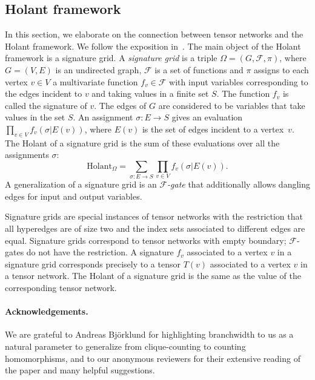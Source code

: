 \documentclass{toc}
\begin{document}
\subsection{Holant framework} \label{sec:Holant_theory}

In this section, we elaborate on the connection between tensor networks and the Holant framework. We follow the exposition in~\cite{CaiLX2011}. The main object of the Holant framework is a signature grid. A \emph{signature grid} is a triple $\Omega = (G,\mathcal{F},\pi)$, where $G=(V,E)$ is an undirected graph, $\mathcal{F}$ is a set of functions and $\pi$ assigns to each vertex $v \in V$ a multivariate function $f_v \in \mathcal{F}$ with input variables corresponding to the edges incident to $v$ and taking values in a finite set $S$. The function $f_v$ is called the signature of $v$. The edges of $G$ are considered to be variables that take values in the set $S$. An assignment $\sigma : E \rightarrow S$ gives an evaluation $\prod_{v \in V} f_v(\sigma|E(v))$, where $E(v)$ is the set of edges incident to a vertex~$v$. The Holant of a signature grid is the sum of these evaluations over all the assignments $\sigma$:
$$
\text{Holant}_{\Omega}=\sum_{\sigma:E \rightarrow S} \prod_{v \in V} f_v(\sigma|E(v)).
$$
A generalization of a signature grid is an \emph{$\mathcal{F}$-gate} that additionally allows dangling edges for input and output variables.

Signature grids are special instances of tensor networks with the restriction that all hyperedges are of size two and the index sets associated to different edges are equal. Signature grids correspond to tensor networks with empty boundary; $\mathcal{F}$-gates do not have the restriction. A signature $f_v$ associated to a vertex $v$ in a signature grid corresponds precisely to a tensor $T(v)$ associated to a vertex $v$ in a tensor network.  The Holant of a signature grid is the same as the value of the corresponding tensor network.


\paragraph{Acknowledgements.}  We are grateful to Andreas Bj\"orklund for highlighting branchwidth
to us as a natural parameter to generalize from clique-counting to counting
homomorphisms, and to our anonymous reviewers for their extensive reading of the paper and many helpful suggestions.

\end{document}
